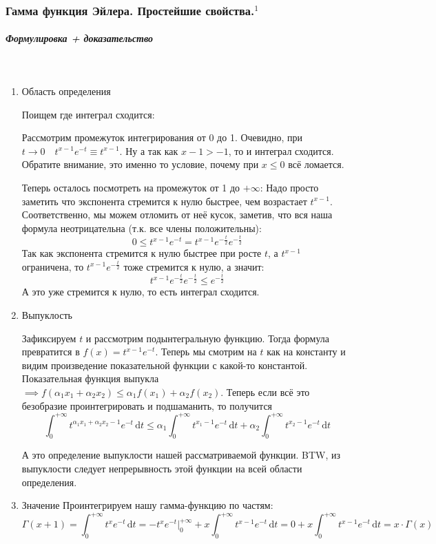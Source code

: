 \documentclass{article}
\def\D{\,\mathrm{d}}
\let\vanillasubparagraph\subparagraph
\renewcommand{\subparagraph}[1]{\vanillasubparagraph{#1}\mbox{}\\}
\begin{document}
\subsubsection{Гамма функция Эйлера. Простейшие свойства.\texorpdfstring{$^1$}{}}
\subparagraph{Формулировка + доказательство}
\begin{enumerate}
    \item Область определения
    
    Поищем где интеграл сходится:
    
    Рассмотрим промежуток интегрирования от 0 до 1. Очевидно, при $t\rightarrow 0 \quad t^{x-1} e^{-t} \equiv t^{x-1}$. Ну а так как $x-1 > -1$, то и интеграл сходится. Обратите внимание, это именно то условие, почему при $x \le 0$ всё ломается.
    
    Теперь осталось посмотреть на промежуток от 1 до $+\infty$:
    Надо просто заметить что экспонента стремится к нулю быстрее, чем возрастает $t^{x-1}$. Соответственно, мы можем отломить от неё кусок, заметив, что вся наша формула неотрицательна (т.к. все члены положительны):
    $$
    0 \le t^{x-1} e^{-t} = t^{x-1} e^{-\frac t2} e^{-\frac t2}
    $$
    Так как экспонента стремится к нулю быстрее при росте $t$, а $t^{x-1}$ ограничена, то $t^{x-1} e^{-\frac t2}$ тоже стремится к нулю, а значит:
    $$
    t^{x-1} e^{-\frac t2} e^{-\frac t2} \le e^{-\frac t2}
    $$
    А это уже стремится к нулю, то есть интеграл сходится.
    
    
    \item Выпуклость
    
    Зафиксируем $t$ и рассмотрим подынтегральную функцию. Тогда формула превратится в $f(x) = t^{x-1}e^{-t}$. Теперь мы смотрим на $t$ как на константу и видим произведение показательной функции с какой-то константой. Показательная функция выпукла $\implies f(\alpha_1 x_1 + \alpha_2 x_2) \le \alpha_1 f(x_1) + \alpha_2 f(x_2)$. Теперь если всё это безобразие проинтегрировать и подшаманить, то получится $$
    \int^{+\infty}_0 t^{\alpha_1 x_1 + \alpha_2 x_2 -1} e^{-t} \D t \le \alpha_1 \int^{+\infty}_0 t^{x_1-1} e^{-t} \D t + \alpha_2 \int^{+\infty}_0 t^{x_2-1} e^{-t} \D t
    $$
    
    А это определение выпуклости нашей рассматриваемой функции. BTW, из выпуклости следует непрерывность этой функции на всей области определения.
    
    \item Значение
    Проинтегрируем нашу гамма-функцию по частям:
    $$
    \Gamma(x+1) = \int^{+\infty}_0 t^{x} e^{-t} \D t = -t^x e^{-t} |^{+\infty}_0 + x\int^{+\infty}_0 t^{x-1} e^{-t} \D t = 0 + x\int^{+\infty}_0 t^{x-1} e^{-t} \D t = x\cdot \Gamma(x)
    $$
    

\end{enumerate}
\end{document}

